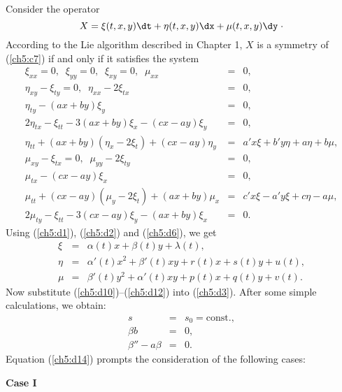 Consider the operator
\[X=\xi (t,x,y)\dt +\eta (t,x,y)\dx+\mu (t,x,y)\dy \; \cdot\]
According to the Lie algorithm described in Chapter 1, $X$ is a symmetry of
(\ref{ch5:c7}) if and only if it satisfies the system
\begin{eqnarray}
\xi_{xx}  =  0,\;\; \xi_{yy}=0,\;\;\xi_{xy}=0,\;\;\mu_{xx} &=& 0, \label{ch5:d1} \\
\eta_{xy}-\xi_{ty} = 0,\;\;\eta_{xx}-2\xi_{tx} &= & 0,\label{ch5:d2}\\
\eta_{ty}-(ax+by)\xi_{y} &= & 0, \label{ch5:d3}\\
2\eta_{tx}-\xi_{tt}-3(ax+by)\xi_{x}-(cx-ay)\xi_{y} &=& 0, \label{ch5:d4}\\
\eta_{tt}+(ax+by)(\eta_x-2\xi_t)+(cx-ay)\eta_y &=& a'x\xi +b'y\eta +
a\eta + b\mu , \label{ch5:d5}\\
\mu_{xy}-\xi_{tx} =  0,\;\;\mu_{yy}-2\xi_{ty} &= & 0, \label{ch5:d6}\\
\mu_{tx}-(cx-ay)\xi_x &= & 0, \label{ch5:d7}\\
\mu_{tt}+ (cx-ay)(\mu_y-2\xi_t)+(ax+by)\mu_x &=&
c'x\xi -a'y\xi + c\eta -a\mu , \label{ch5:d8}\\
2\mu_{ty}-\xi_{tt}-3(cx-ay)\xi_y-(ax+by)\xi_x &=& 0. \label{ch5:d9}
\end{eqnarray}
Using (\ref{ch5:d1}), (\ref{ch5:d2}) and (\ref{ch5:d6}), we get
\begin{eqnarray}
\xi &= & \alpha (t) x+\beta (t) y+\lambda (t), \label{ch5:d10}\\
\eta  &=& \alpha '(t)x^2+\beta '(t)xy+r(t)x+s(t)y+u(t), \label{ch5:d11}\\
\mu &=& \beta '(t)y^2+\alpha '(t)xy+p(t)x+q(t)y+v(t). \label{ch5:d12}
\end{eqnarray}
Now substitute (\ref{ch5:d10})--(\ref{ch5:d12}) into (\ref{ch5:d3}). After some
simple calculations, we obtain:
\begin{eqnarray}
s &=&s_0=\mbox{const.}, \label{ch5:d13}\\
\beta b &= & 0,\label{ch5:d14}\\
\beta ''-a\beta &= & 0. \label{ch5:d15}
\end{eqnarray}
Equation (\ref{ch5:d14}) prompts the consideration of the following cases:

{\bf Case I   }

